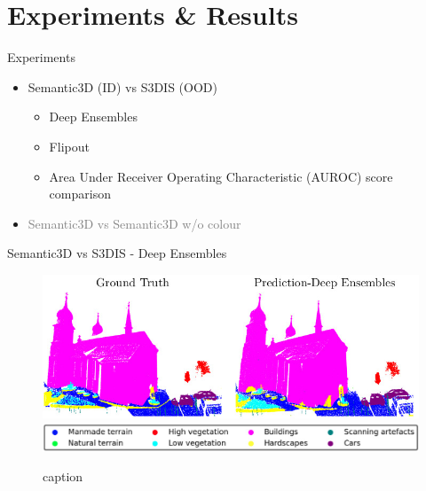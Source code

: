 \documentclass[aspectratio=169]{beamer}
\begin{document}
\section{Experiments \& Results}
\begin{frame}[noframenumbering]{Experiments}
    \begin{itemize}
        \item Semantic3D (ID) vs S3DIS (OOD)
        \begin{itemize}
            \item Deep Ensembles
            \item Flipout
            \item Area Under Receiver Operating Characteristic (AUROC) score comparison
        \end{itemize}
        \item \textcolor{gray}{Semantic3D vs Semantic3D w/o colour}
    \end{itemize}
\end{frame}
\begin{frame}{Semantic3D vs S3DIS - Deep Ensembles}
    \begin{figure}
        \centering
        \includegraphics[scale=0.5]{images/sem3d/Sem3d_DE_output.jpg}
        \includegraphics[scale=0.25]{images/legend.jpg}
        \caption{caption}
        \label{fig:sem3d_de_op}
    \end{figure}
\end{frame}
\end{document}
